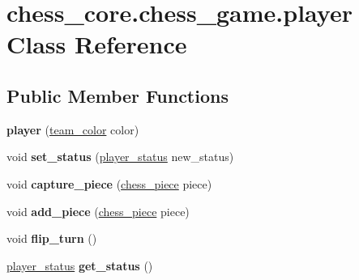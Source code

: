 \hypertarget{classchess__core_1_1chess__game_1_1player}{}\section{chess\+\_\+core.\+chess\+\_\+game.\+player Class Reference}
\label{classchess__core_1_1chess__game_1_1player}
\subsection*{Public Member Functions}
\begin{DoxyCompactItemize}
\item 
\hypertarget{classchess__core_1_1chess__game_1_1player_ab932b0747af832c8e294f7dc0a34543a}{}{\bfseries player} (\hyperlink{enumchess__core_1_1team__color}{team\+\_\+color} color)\label{classchess__core_1_1chess__game_1_1player_ab932b0747af832c8e294f7dc0a34543a}

\item 
\hypertarget{classchess__core_1_1chess__game_1_1player_ae1f662d1ab3b8fe53e21545fc5e2b671}{}void {\bfseries set\+\_\+status} (\hyperlink{enumchess__core_1_1player__status}{player\+\_\+status} new\+\_\+status)\label{classchess__core_1_1chess__game_1_1player_ae1f662d1ab3b8fe53e21545fc5e2b671}

\item 
\hypertarget{classchess__core_1_1chess__game_1_1player_a8613ebf856946ba911073f3c1d20a3b4}{}void {\bfseries capture\+\_\+piece} (\hyperlink{classchess__core_1_1chess__piece}{chess\+\_\+piece} piece)\label{classchess__core_1_1chess__game_1_1player_a8613ebf856946ba911073f3c1d20a3b4}

\item 
\hypertarget{classchess__core_1_1chess__game_1_1player_afd9d550f13050d9ea3d0c2f3b91ce74a}{}void {\bfseries add\+\_\+piece} (\hyperlink{classchess__core_1_1chess__piece}{chess\+\_\+piece} piece)\label{classchess__core_1_1chess__game_1_1player_afd9d550f13050d9ea3d0c2f3b91ce74a}

\item 
\hypertarget{classchess__core_1_1chess__game_1_1player_a6b2e489c5a8764e0b9948034d003efde}{}void {\bfseries flip\+\_\+turn} ()\label{classchess__core_1_1chess__game_1_1player_a6b2e489c5a8764e0b9948034d003efde}

\item 
\hypertarget{classchess__core_1_1chess__game_1_1player_a40a2c16b2a5ce09fa323fe8989fd9d5a}{}\hyperlink{enumchess__core_1_1player__status}{player\+\_\+status} {\bfseries get\+\_\+status} ()\label{classchess__core_1_1chess__game_1_1player_a40a2c16b2a5ce09fa323fe8989fd9d5a}


\end{DoxyCompactItemize}
